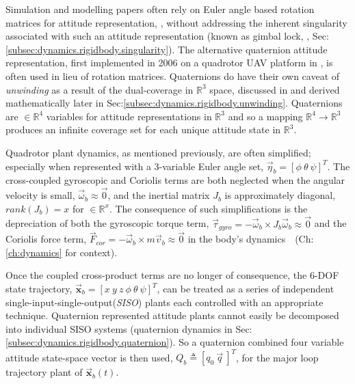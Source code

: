 \par
Simulation and modelling papers often rely on Euler angle based rotation matrices for attitude representation, \cite{adaptivedisturbancecontrol, optimizedpidquadcopter, singleaxistilting, backsteppingquadcoptercontrol, fullquadcoptercontrol}, without addressing the inherent singularity associated with such an attitude representation (known as gimbal lock, \cite{euleranglesingularity}, Sec:\ref{subsec:dynamics.rigidbody.singularity}). The alternative quaternion attitude representation, first implemented in 2006 on a quadrotor UAV platform in \cite{attitudestabilization}, is often used in lieu of rotation matrices. Quaternions do have their own caveat of \emph{unwinding} as a result of the dual-coverage in $\mathbb{R}^3$ space, discussed in \cite{unwinding} and derived mathematically later in Sec:\ref{subsec:dynamics.rigidbody.unwinding}. Quaternions are $\in\mathbb{R}^4$ variables for attitude representations in $\mathbb{R}^3$ and so a mapping $\mathbb{R}^4\rightarrow\mathbb{R}^3$ produces an infinite coverage set for each unique attitude state in $\mathbb{R}^3$.
\par
Quadrotor plant dynamics, as mentioned previously, are often simplified; especially when represented with a 3-variable Euler angle set, $\vec{\eta}_b = [\phi ~\theta ~\psi]^T$. The cross-coupled gyroscopic and Coriolis terms are both neglected when the angular velocity is small, $\vec{\omega}_b \approx \vec{0}$, and the inertial matrix $J_b$ is approximately diagonal, $rank(J_b)= x$ for $\in\mathbb{R}^x$. The consequence of such simplifications is the depreciation of both the gyroscopic torque term, $\vec{\tau}_{gyro}=-\vec{\omega}_b \times J_b\vec{\omega}_b \approx \vec{0}$ and the  Coriolis force term, $\vec{F}_{cor}=-\vec{\omega}_b \times m\vec{v}_b \approx \vec{0}$ in the body's dynamics~~(Ch:\ref{ch:dynamics} for context). 
\par
Once the coupled cross-product terms are no longer of consequence, the 6-DOF state trajectory, $\vec{\mathbf{x}}_b=[x ~y ~z ~\phi ~\theta ~\psi]^T$, can be treated as a series of independent single-input-single-output(\emph{SISO}) plants each controlled with an appropriate technique. Quaternion represented attitude plants cannot easily be decomposed into individual SISO systems (quaternion dynamics in Sec:\ref{subsec:dynamics.rigidbody.quaternion}). So a quaternion combined four variable attitude state-space vector is then used, $Q_b \triangleq [q_0 ~\vec{q}\>]^T$, for the major loop trajectory plant of $\vec{\mathbf{x}}_b(t)$.
\par
